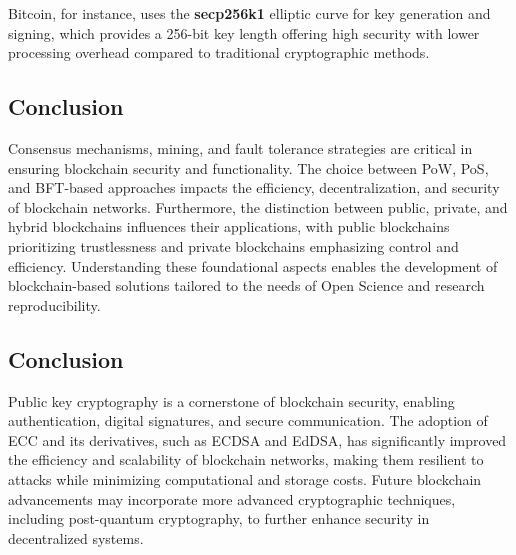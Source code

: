 \documentclass{article}
\begin{document}
Bitcoin, for instance, uses the \textbf{secp256k1} elliptic curve for key generation and signing, which provides a 256-bit key length offering high security with lower processing overhead compared to traditional cryptographic methods.

\subsection{Conclusion}
Consensus mechanisms, mining, and fault tolerance strategies are critical in ensuring blockchain security and functionality. The choice between PoW, PoS, and BFT-based approaches impacts the efficiency, decentralization, and security of blockchain networks. Furthermore, the distinction between public, private, and hybrid blockchains influences their applications, with public blockchains prioritizing trustlessness and private blockchains emphasizing control and efficiency. Understanding these foundational aspects enables the development of blockchain-based solutions tailored to the needs of Open Science and research reproducibility.

\subsection*{Conclusion}
Public key cryptography is a cornerstone of blockchain security, enabling authentication, digital signatures, and secure communication. The adoption of ECC and its derivatives, such as ECDSA and EdDSA, has significantly improved the efficiency and scalability of blockchain networks, making them resilient to attacks while minimizing computational and storage costs. Future blockchain advancements may incorporate more advanced cryptographic techniques, including post-quantum cryptography, to further enhance security in decentralized systems.





\end{document}
